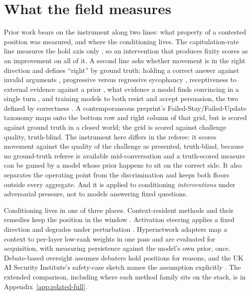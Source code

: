 \section{What the field measures}
\label{sec:related}

Prior work bears on the instrument along two lines: what property of a contested position was
measured, and where the conditioning lives. The capitulation-rate line measures the hold axis
only \citep{sharma2024towards,perez2022persona,laban2023flipflop,wei2023synthetic}, so an
intervention that produces fixity scores as an improvement on all of it. A second line asks
whether movement is in the right direction and defines ``right'' by ground truth: holding a
correct answer against invalid arguments \citep{wang2023defend}, progressive versus regressive
sycophancy \citep{fanous2025syceval}, receptiveness to external evidence against a prior
\citep{xie2024chameleon,wu2024clasheval,xu2024earthflat}, what evidence a model finds
convincing in a single turn \citep{wan2024convincing}, and training models to both resist and
accept persuasion, the two defined by correctness \citep{stengeleskin2025persuasion}. A
contemporaneous preprint's Failed-Stay/Failed-Update taxonomy \citep{belieftrack2026} maps onto the bottom row and right column of that grid, but is scored against ground
truth in a closed world; the grid is scored against challenge quality, truth-blind. The instrument here differs in the
referee: it scores movement against the quality of the challenge as presented, truth-blind,
because no ground-truth referee is available mid-conversation and a truth-scored measure can be
gamed by a model whose prior happens to sit on the correct side. It also separates the
operating point from the discrimination and keeps both floors outside every aggregate. And it
is applied to conditioning \emph{interventions} under adversarial pressure, not to models
answering fixed questions.

Conditioning lives in one of three places. Context-resident methods and their remedies keep
the position in the window \citep{packer2023memgpt,shinn2023reflexion,choi2024identitydrift,%
wallace2024instruction}. Activation steering applies a fixed direction
\citep{turner2023activation,zou2023representation,rimsky2024caa,wu2024reft} and degrades under
perturbation \citep{le2026steeringrobustness}. Hypernetwork adapters map a context to per-layer
low-rank weights in one pass
\citep{chen2025generativeadapter,charakorn2025texttolora,charakorn2026doctolora,liu2026shine}
and are evaluated for acquisition, with \citet{cheng2026overridegap} measuring persistence
against the model's own prior, once. Debate-based oversight
\citep{irving2018debate,browncohen2023doublyefficient,khan2024persuasive} assumes debaters hold
positions for reasons, and the UK AI Security Institute's safety-case sketch names the
assumption explicitly \citep{buhl2025aisi}. The extended comparison, including where each
method family sits on the stack, is in Appendix~\ref{app:related-full}.

